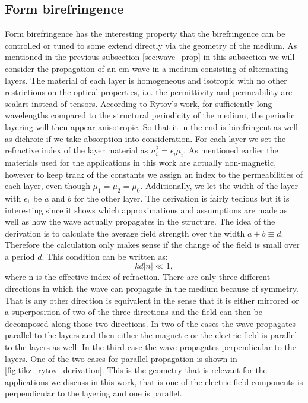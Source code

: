 \subsection{Form birefringence}
\label{sec:form_birefringence}
Form birefringence has the interesting property that the birefringence can be controlled or tuned to some extend directly via the geometry of the medium. As mentioned in the previous subsection \ref{sec:wave_prop} in this subsection we will consider the propagation of an em-wave in a medium consisting of alternating layers. The material of each layer is homogeneous and isotropic with no other restrictions on the optical properties, i.e. the permittivity and permeability are scalars instead of tensors. According to Rytov's work, for sufficiently long wavelengths compared to the structural periodicity of the medium, the periodic layering will then appear anisotropic. So that it in the end is birefringent as well as dichroic if we take absorption into consideration. For each layer we set the refractive index of the layer material as $n_i^2 = \epsilon_i \mu_i$. As mentioned earlier the materials used for the applications in this work are actually non-magnetic, however to keep track of the constants we assign an index to the permeabilities of each layer, even though $\mu_1=\mu_2=\mu_0$. Additionally, we let the width of the layer with $\epsilon_1$ be $a$ and $b$ for the other layer. The derivation is fairly tedious but it is interesting since it shows which approximations and assumptions are made as well as how the wave actually propagates in the structure. The idea of the derivation is to calculate the average field strength over the width $a+b\equiv d$. Therefore the calculation only makes sense if the change of the field is small over a period $d$. This condition can be written as:
\begin{equation}
    \label{eq:rytov_cond1}
    kd|n|\ll 1,
\end{equation}
where n is the effective index of refraction. There are only three different directions in which the wave can propagate in the medium because of symmetry. That is any other direction is equivalent in the sense that it is either mirrored or a superposition of two of the three directions and the field can then be decomposed along those two directions. In two of the cases the wave propagates parallel to the layers and then either the magnetic or the electric field is parallel to the layers as well. In the third case the wave propagates perpendicular to the layers. One of the two cases for parallel propagation is shown in \ref{fig:tikz_rytov_derivation}. This is the geometry that is relevant for the applications we discuss in this work, that is one of the electric field components is perpendicular to the layering and one is parallel. 

